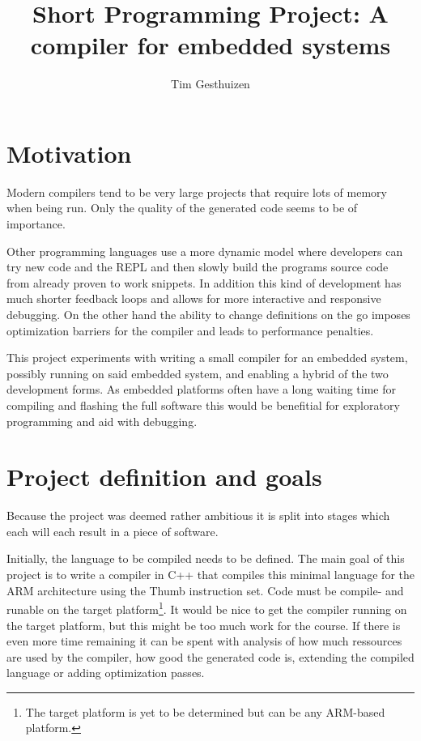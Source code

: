 \documentclass[12pt, a4paper]{article}
\author{Tim Gesthuizen}
\title{Short Programming Project: A compiler for embedded systems}
\begin{document}
\maketitle

\section{Motivation}

Modern compilers tend to be very large projects that require lots of
memory when being run.
Only the quality of the generated code seems to be of importance.

Other programming languages use a more dynamic model where developers
can try new code and the REPL and then slowly build the programs
source code from already proven to work snippets.
In addition this kind of development has much shorter feedback loops
and allows for more interactive and responsive debugging.
On the other hand the ability to change definitions on the go imposes
optimization barriers for the compiler and leads to performance
penalties.

This project experiments with writing a small compiler for an embedded
system, possibly running on said embedded system, and enabling a
hybrid of the two development forms.
As embedded platforms often have a long waiting time for compiling and
flashing the full software this would be benefitial for exploratory
programming and aid with debugging.

\section{Project definition and goals}

Because the project was deemed rather ambitious it is split into
stages which each will each result in a piece of software.

Initially, the language to be compiled needs to be defined.
The main goal of this project is to write a compiler in C++ that
compiles this minimal language for the ARM architecture using the
Thumb instruction set.
Code must be compile- and runable on the  target platform\footnote{The
  target platform is yet to be determined but can be any ARM-based
  platform.}.
It would be nice to get the compiler running on the target platform,
but this might be too much work for the course.
If there is even more time remaining it can be spent with analysis of
how much ressources are used by the compiler, how good the generated
code is, extending the compiled language or adding optimization
passes.
\end{document}
